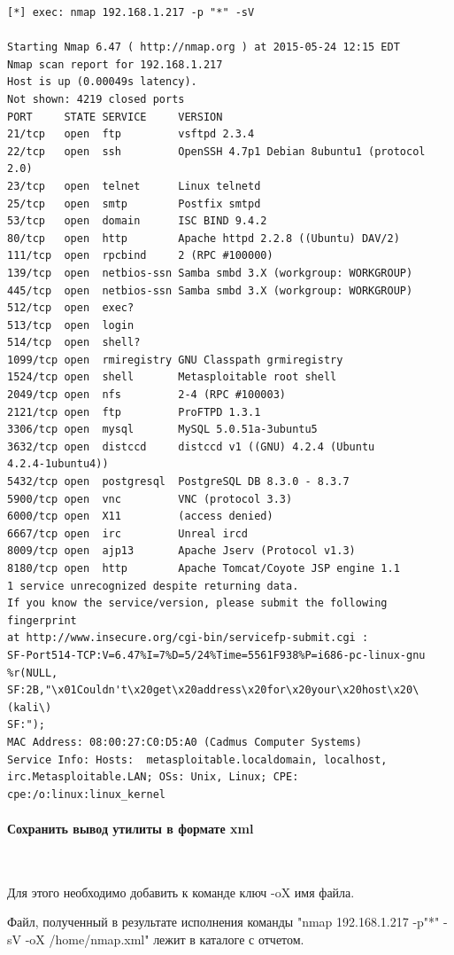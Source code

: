 \documentclass{article}
\begin{document}
\begin{verbatim}
[*] exec: nmap 192.168.1.217 -p "*" -sV

Starting Nmap 6.47 ( http://nmap.org ) at 2015-05-24 12:15 EDT
Nmap scan report for 192.168.1.217
Host is up (0.00049s latency).
Not shown: 4219 closed ports
PORT     STATE SERVICE     VERSION
21/tcp   open  ftp         vsftpd 2.3.4
22/tcp   open  ssh         OpenSSH 4.7p1 Debian 8ubuntu1 (protocol 2.0)
23/tcp   open  telnet      Linux telnetd
25/tcp   open  smtp        Postfix smtpd
53/tcp   open  domain      ISC BIND 9.4.2
80/tcp   open  http        Apache httpd 2.2.8 ((Ubuntu) DAV/2)
111/tcp  open  rpcbind     2 (RPC #100000)
139/tcp  open  netbios-ssn Samba smbd 3.X (workgroup: WORKGROUP)
445/tcp  open  netbios-ssn Samba smbd 3.X (workgroup: WORKGROUP)
512/tcp  open  exec?
513/tcp  open  login
514/tcp  open  shell?
1099/tcp open  rmiregistry GNU Classpath grmiregistry
1524/tcp open  shell       Metasploitable root shell
2049/tcp open  nfs         2-4 (RPC #100003)
2121/tcp open  ftp         ProFTPD 1.3.1
3306/tcp open  mysql       MySQL 5.0.51a-3ubuntu5
3632/tcp open  distccd     distccd v1 ((GNU) 4.2.4 (Ubuntu
4.2.4-1ubuntu4))
5432/tcp open  postgresql  PostgreSQL DB 8.3.0 - 8.3.7
5900/tcp open  vnc         VNC (protocol 3.3)
6000/tcp open  X11         (access denied)
6667/tcp open  irc         Unreal ircd
8009/tcp open  ajp13       Apache Jserv (Protocol v1.3)
8180/tcp open  http        Apache Tomcat/Coyote JSP engine 1.1
1 service unrecognized despite returning data. 
If you know the service/version, please submit the following fingerprint
at http://www.insecure.org/cgi-bin/servicefp-submit.cgi :
SF-Port514-TCP:V=6.47%I=7%D=5/24%Time=5561F938%P=i686-pc-linux-gnu
%r(NULL,
SF:2B,"\x01Couldn't\x20get\x20address\x20for\x20your\x20host\x20\(kali\)
SF:");
MAC Address: 08:00:27:C0:D5:A0 (Cadmus Computer Systems)
Service Info: Hosts:  metasploitable.localdomain, localhost,
irc.Metasploitable.LAN; OSs: Unix, Linux; CPE: cpe:/o:linux:linux_kernel
\end{verbatim}

\paragraph{Сохранить вывод утилиты в формате xml}
~

Для этого необходимо добавить к команде ключ -oX имя файла.

Файл, полученный в результате исполнения команды 
"nmap 192.168.1.217 -p"*" -sV -oX /home/nmap.xml" лежит в каталоге с
отчетом.
\end{document}
